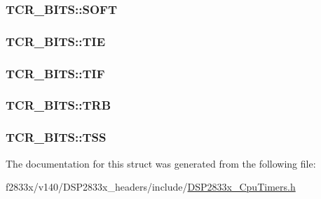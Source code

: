 \subsubsection[{S\+O\+F\+T}]{ T\+C\+R\+\_\+\+B\+I\+T\+S\+::\+S\+O\+F\+T}\label{struct_t_c_r___b_i_t_s_a7ac3fec3d9828d2cee647423f050a9d9}
\hypertarget{struct_t_c_r___b_i_t_s_a55234d492e5b9cbe53b06190f73bef03}{}
\subsubsection[{T\+I\+E}]{ T\+C\+R\+\_\+\+B\+I\+T\+S\+::\+T\+I\+E}\label{struct_t_c_r___b_i_t_s_a55234d492e5b9cbe53b06190f73bef03}
\hypertarget{struct_t_c_r___b_i_t_s_a6a08bcf84c05eb8ee568bfb745cc38c9}{}
\subsubsection[{T\+I\+F}]{ T\+C\+R\+\_\+\+B\+I\+T\+S\+::\+T\+I\+F}\label{struct_t_c_r___b_i_t_s_a6a08bcf84c05eb8ee568bfb745cc38c9}
\hypertarget{struct_t_c_r___b_i_t_s_a81c378efa63bd5878e67d9a4ec14d5a9}{}
\subsubsection[{T\+R\+B}]{ T\+C\+R\+\_\+\+B\+I\+T\+S\+::\+T\+R\+B}\label{struct_t_c_r___b_i_t_s_a81c378efa63bd5878e67d9a4ec14d5a9}
\hypertarget{struct_t_c_r___b_i_t_s_a6308ea6a3826961b6de099d2cc6c2663}{}
\subsubsection[{T\+S\+S}]{ T\+C\+R\+\_\+\+B\+I\+T\+S\+::\+T\+S\+S}\label{struct_t_c_r___b_i_t_s_a6308ea6a3826961b6de099d2cc6c2663}


The documentation for this struct was generated from the following file\+:\begin{DoxyCompactItemize}
\item 
f2833x/v140/\+D\+S\+P2833x\+\_\+headers/include/\hyperlink{_d_s_p2833x___cpu_timers_8h}{D\+S\+P2833x\+\_\+\+Cpu\+Timers.\+h}\end{DoxyCompactItemize}
